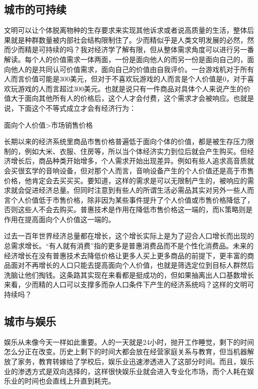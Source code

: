 \documentclass[]{book}
\begin{document}
\hypertarget{ux57ceux5e02ux7684ux53efux6301ux7eed}{%
\subsection{城市的可持续}\label{ux57ceux5e02ux7684ux53efux6301ux7eed}}

文明可以让个体脱离物种的生存要求来实现其他诉求或者说高质量的生活，整体后果就是种群数量被内部社会结构限制住了。少而精似乎是人类文明发展的必然，然而少而精是可持续的吗？我对经济学了解有限，但从整体需求角度可以进行另一番解读。每个人的价值需求一体两面，一份是面向他人的而另一份是面向自己的，面向他人的是共同认可价值需求，面向自己的价值由自我评价。一台游戏机对于所有人而言价值可能是300美元，但对于不喜欢玩游戏的人而言是个人价值是0，对于喜欢玩游戏的人而言超过300美元。也就是说只有一件商品对具体个人来说产生的价值大于面向其他所有人的价格后，这个人才会付费，这个需求才会被响应。也就是说，下面这个不等式成立才会有经济行为：

面向个人价值\textgreater{}市场销售价格

长期以来的经济系统里商品市售价格普遍低于面向个体的价值，都是被生存压力限制的，例如大米、衣服、住房等，所以当个体经济实力到位后就会产生购买。但经济增长后，商品种类开始增多，个人需求开始出现差异。例如有些人追求高音质就会买很玄学的音响设备，但对那个人而言，音响设备产生的个人价值还是高于市售价格，他肯定会去买买买。要知道，这样的需求是可以无限制产生的，被响应的需求就会促进经济总量。但同时注意到有些人的所谓生活必需品其实对另外一些人而言个人价值低于市售价格，除非因为某些事件提升了个人价值或市售价格降低了，否则这些人不会去购买。普惠技术是作用在降低市售价格这一端的，而K策略则是作用在提高面向个人价值这一端的。

过去一百年世界经济总量都在增长，这个增长实际上是为了迎合人口增长而出现的总需求增长。``有人就有消费''指的更多是普惠消费品而不是个性化消费品。未来的经济增长在没有普惠技术去降低价格让更多人买上更多商品的前提下，更丰富的商品面对不再增长的人口只能去提高面向个人价值，也就是筛选定位到目标人群然后洗脑让他们掏钱。这条路其实现在来看都是挺成功的，但如果抽离出人口基数增长来看，少而精的人口可以支撑多而杂人口条件下产生的经济系统吗？这样的文明可持续吗？

\hypertarget{ux57ceux5e02ux4e0eux5a31ux4e50}{%
\subsection{城市与娱乐}\label{ux57ceux5e02ux4e0eux5a31ux4e50}}

娱乐从未像今天一样如此重要。人的一天就是24小时，抛开工作睡觉，剩下的时间怎么分正在改变。历史上剩下的时间大都会放在经营家庭关系与教育，但当机器解放了家务，教育转嫁给了学校后，娱乐业迅速渗透进入了这部分时间。而且，娱乐业的渗透方式是双向选择的，这样很快娱乐业就会进入专业化市场，而个人耗在娱乐业的时间也会直线上升直到耗完。
\end{document}
